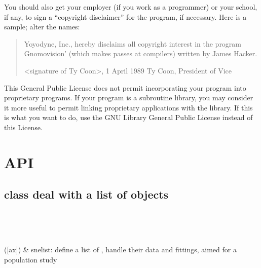 \documentclass[letterpaper,10pt,english]{sphinxmanual}
\begin{document}
You should also get your employer (if you work as a programmer) or your
school, if any, to sign a “copyright disclaimer” for the program, if
necessary.  Here is a sample; alter the names:
\begin{quote}

Yoyodyne, Inc., hereby disclaims all copyright interest in the program
{\color{red}\bfseries{}\textasciigrave{}}Gnomovision’ (which makes passes at compilers) written by James Hacker.

\textless{}signature of Ty Coon\textgreater{}, 1 April 1989
Ty Coon, President of Vice
\end{quote}

This General Public License does not permit incorporating your program into
proprietary programs.  If your program is a subroutine library, you may
consider it more useful to permit linking proprietary applications with the
library.  If this is what you want to do, use the GNU Library General
Public License instead of this License.


\chapter{API}
\label{\detokenize{index:api}}

\section{ \textendash{} class deal with a list of objects}
\label{\detokenize{snelist:snelist-class-deal-with-a-list-of-objects}}\label{\detokenize{snelist:snelist}}\label{\detokenize{snelist::doc}}

\begin{savenotes}\sphinxatlongtablestart\begin{longtable}[c]{}
\hline

\endfirsthead

%
{}\\
\hline

\endhead

\hline
{}\\
\endfoot

\endlastfoot

{\hyperref[\detokenize{generated/sdapy.snerun.snelist:sdapy.snerun.snelist}]{}}({[}ax{]})
&
snelist: define a list of , handle their data and fittings, aimed for a population study
\\
\hline
\end{longtable}\sphinxatlongtableend\end{savenotes}
\end{document}
